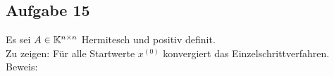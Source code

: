 \subsection*{Aufgabe 15}
Es sei $A \in \mathbb K^{n\times n}$ Hermitesch und positiv definit.\\
Zu zeigen: Für alle Startwerte $x^{(0)}$ konvergiert das Einzelschrittverfahren.\\
Beweis: 